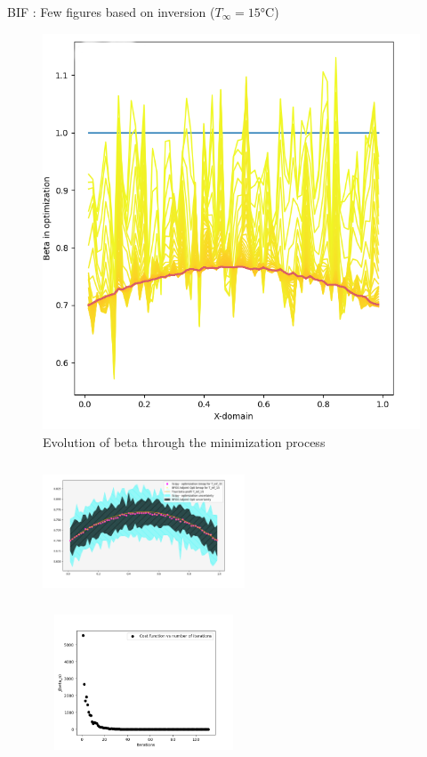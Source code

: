 \documentclass[10pt,
			   xcolor=svgnames,
			   hyperref={linkcolor=red, citecolor = DarkGreen, colorlinks=true, urlcolor=Navy}] {beamer}
\begin{document}
\begin{frame}{BIF : Few figures based on inversion ($T_\infty = \ang{15}$C)}
	\begin{multicols}{2}
		\noindent
		\begin{figure}[H]
			\centering
			\includegraphics[scale=0.25]{Pres_Evolution_beta_map.png}
			\caption{Evolution of beta through the minimization process}
		\end{figure}

	\columnbreak
	
		\vspace*{-1cm}
		\begin{figure}[H]
			\centering
			\includegraphics[height=4cm, width=6cm]{Pres_T_15_Full_Beta_Comp.png}
		\end{figure}
	
		\vspace*{-2.5cm}
		\begin{figure}[H]
			\centering
			\includegraphics[height=4cm, width=6cm]{Evolution_de_l'erreur_T_inf_15.png}
		\end{figure}		


\end{multicols}
\end{frame}
\end{document}
